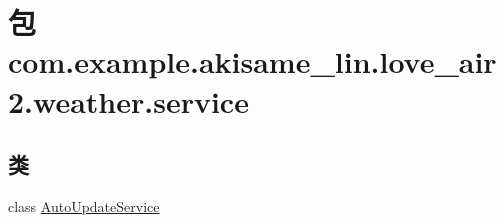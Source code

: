\hypertarget{namespacecom_1_1example_1_1akisame__lin_1_1love__air2_1_1weather_1_1service}{}\section{包 com.\+example.\+akisame\+\_\+lin.\+love\+\_\+air2.\+weather.\+service}
\label{namespacecom_1_1example_1_1akisame__lin_1_1love__air2_1_1weather_1_1service}
\subsection*{类}
\begin{DoxyCompactItemize}
\item 
class \mbox{\hyperlink{classcom_1_1example_1_1akisame__lin_1_1love__air2_1_1weather_1_1service_1_1_auto_update_service}{Auto\+Update\+Service}}
\end{DoxyCompactItemize}
